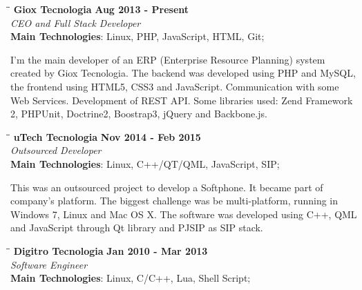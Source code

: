 \documentclass[margin]{res}
\begin{document}
\begin{resume}
\vspace{-0.1in}
   \begin{tabbing}
   \hspace{2.3in}\= \hspace{1.7in}\= \kill %
    \textbf{Giox Tecnologia}    \>\>\textbf{Aug 2013 - Present}\\
    \textit{CEO and Full Stack Developer}\\        
    \textbf{Main Technologies}: Linux, PHP, JavaScript, HTML, Git;
   \end{tabbing}\vspace{-20pt}      %
    \vspace{2mm}
I'm the main developer of an ERP (Enterprise Resource Planning) system created by Giox Tecnologia.
The backend was developed using PHP and MySQL, the frontend using HTML5, CSS3 and JavaScript. Communication with some Web 
Services. Development of REST API. Some libraries used: Zend Framework 2, PHPUnit, Doctrine2, Boostrap3, jQuery and Backbone.js.
\vspace{-0.1in}
   \begin{tabbing}
   \hspace{2.3in}\= \hspace{1.7in}\= \kill %
    \textbf{uTech Tecnologia}    \>\>\textbf{Nov 2014 - Feb 2015}\\
    \textit{Outsourced Developer}\\        
    \textbf{Main Technologies}: Linux, C++/QT/QML, JavaScript, SIP;
   \end{tabbing}\vspace{-20pt}      %
    \vspace{2mm}
This was an outsourced project to develop a Softphone. It became part of company’s 
platform. The biggest challenge was be multi-platform, running in Windows 7, Linux and Mac OS X.
The software was developed using C++, QML and JavaScript through Qt library and PJSIP as SIP stack.

   \begin{tabbing}
   \hspace{2.3in}\= \hspace{1.7in}\= \kill %
    \textbf{Digitro Tecnologia}    \>\>\textbf{Jan 2010 - Mar 2013}\\
    \textit{Software Engineer}\\   
    \textbf{Main Technologies}: Linux, C/C++, Lua, Shell Script;
   \end{tabbing}\vspace{-20pt}      %
    \vspace{2mm}


\end{resume}
\end{document}
